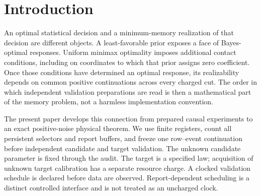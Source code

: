 \begin{abstract}
We relate minimax contact geometry to the memory of causal statistical
experiments. For a two-parameter family of full-support marked targets,
we determine the exact two-preparation saddle and prove that five states
are necessary and sufficient at the decision cut. The original
positive-noise hard-sphere sensor is shown, by its preparation and
reflection symmetries, to belong to this family throughout the explicit
range $0<\sigma\le1/24$. A facial scheduling criterion supplies converses
uniform over stochastic encoders and over the declared validation order.
Among all twenty clocked interleavings of the two three-slot validation
tapes, the exact minimum peak is twelve; precisely the two serial orders
attain it, and every nonserial order requires at least fourteen states.
At zero noise, reverse serial validation instead has exact peak ten.
Thus exact causal memory can jump at a support boundary while the
statistical value varies continuously. We also retain the causal
foundations, controlled minimax duality, exact ideal saddles,
all-preparation localization, and resource-accounted transport results
that enter this theorem chain.
\end{abstract}
\maketitle
\tableofcontents

\section{Introduction}
An optimal statistical decision and a minimum-memory realization of
that decision are different objects. A least-favorable prior exposes a
face of Bayes-optimal responses. Uniform minimax optimality imposes
additional contact conditions, including on coordinates to which that
prior assigns zero coefficient. Once those conditions have determined
an optimal response, its realizability depends on common positive
continuations across every charged cut. The order in which independent
validation preparations are read is then a mathematical part of the
memory problem, not a harmless implementation convention.

The present paper develops this connection from prepared causal
experiments to an exact positive-noise physical theorem. We use finite
registers, count all persistent selectors and report buffers, and freeze
one row--event continuation before independent candidate and target
validation. The unknown candidate parameter is fixed through the audit.
The target is a specified law; acquisition of unknown target calibration
has a separate resource charge. A clocked validation schedule is declared
before data are observed. Report-dependent scheduling is a distinct
controlled interface and is not treated as an uncharged clock.

